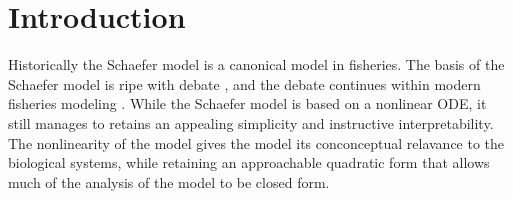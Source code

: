 %
\section{Introduction\label{ptInt}}


%
Historically the Schaefer model is a canonical model in fisheries. %
The basis of the Schaefer model is ripe with debate \cite{kingsland_refractory_1982},
and the debate continues within modern fisheries modeling \cite{prager_comparison_2002, maunder_is_2003, prager_reply_2003}.
While the Schaefer model is based on a nonlinear ODE, it still manages to retains 
an appealing simplicity and instructive interpretability. %
The nonlinearity of the model gives the model its conconceptual relavance to the 
biological systems, while retaining an approachable quadratic form that allows 
much of the analysis of the model to be closed form.  


